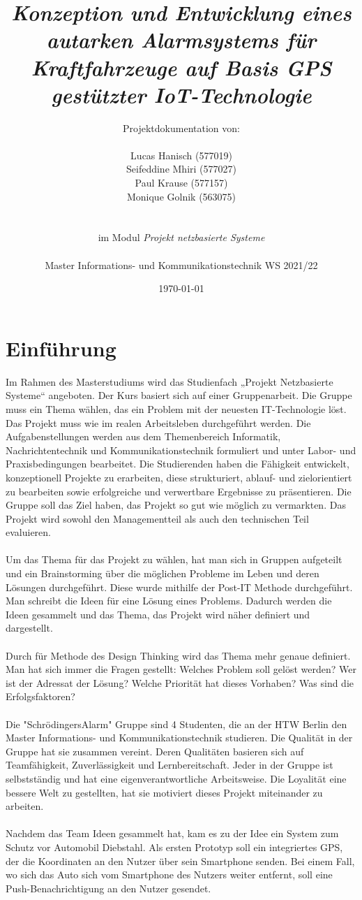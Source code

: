 \documentclass[11pt,a4paper,ngerman]{report}
\date{\today}
\title{ \textbf{\textit{Konzeption und Entwicklung eines autarken Alarmsystems für Kraftfahrzeuge auf Basis GPS gestützter IoT-Technologie}}}
\author{Projektdokumentation von: \\ \\ Lucas Hanisch (577019) \\ Seifeddine Mhiri (577027) \\ Paul Krause (577157)  \\  Monique Golnik (563075) \\ \\ \\ im Modul \textit{Projekt netzbasierte Systeme} \\ \\ Master Informations- und Kommunikationstechnik WS 2021/22 }
\begin{document}
	\maketitle
	\tableofcontents
	
\chapter{Einführung}
	
Im Rahmen des Masterstudiums wird das Studienfach „Projekt Netzbasierte Systeme“ angeboten. Der Kurs basiert sich auf einer Gruppenarbeit.
Die Gruppe muss ein Thema wählen, das ein Problem mit der neuesten IT-Technologie löst. Das Projekt muss wie im realen Arbeitsleben durchgeführt werden. Die Aufgabenstellungen werden aus dem Themenbereich Informatik, Nachrichtentechnik und Kommunikationstechnik formuliert und unter Labor- und
Praxisbedingungen bearbeitet. Die Studierenden haben die Fähigkeit entwickelt, konzeptionell Projekte zu erarbeiten, diese strukturiert, ablauf- und zielorientiert zu
bearbeiten sowie erfolgreiche und verwertbare Ergebnisse zu präsentieren.
Die Gruppe soll das Ziel haben, das Projekt so gut wie möglich zu vermarkten.
Das Projekt wird sowohl den Managementteil als auch den technischen Teil evaluieren.\\\\
Um das Thema für das Projekt zu wählen, hat man sich in Gruppen aufgeteilt und ein Brainstorming über die möglichen Probleme im Leben und deren Lösungen durchgeführt. 
Diese wurde mithilfe der Post-IT Methode durchgeführt. Man schreibt die Ideen für eine Lösung eines Problems.
Dadurch werden die Ideen gesammelt und das Thema, das Projekt wird näher definiert und  dargestellt. \\\\
Durch für Methode des Design Thinking wird das Thema mehr genaue definiert. Man hat sich immer die Fragen gestellt: Welches Problem soll gelöst werden? Wer ist der Adressat der Lösung? Welche Priorität hat dieses Vorhaben? Was sind die Erfolgsfaktoren? \\\\
Die "SchrödingersAlarm" Gruppe sind 4 Studenten, die an der HTW Berlin den Master Informations- und Kommunikationstechnik studieren. Die Qualität in der Gruppe hat sie zusammen vereint. Deren Qualitäten basieren sich auf Teamfähigkeit, Zuverlässigkeit und Lernbereitschaft. Jeder in der Gruppe ist selbstständig und hat eine eigenverantwortliche Arbeitsweise. Die Loyalität eine bessere Welt zu gestellten, hat sie motiviert dieses Projekt miteinander zu arbeiten.\\\\
Nachdem das Team Ideen gesammelt hat, kam es zu der Idee ein System zum Schutz vor Automobil Diebstahl. 
Als ersten Prototyp soll ein integriertes GPS, der die Koordinaten an den Nutzer über sein Smartphone senden. 
Bei einem Fall, wo sich das Auto sich vom Smartphone des Nutzers weiter entfernt, soll eine Push-Benachrichtigung an den Nutzer gesendet.
	
\end{document}
